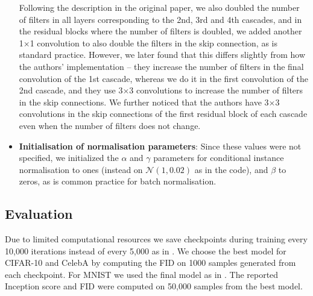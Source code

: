 \begin{itemize}
    Following the description in the original paper, we also doubled the number of filters in all layers corresponding to the 2nd, 3rd and 4th cascades, and in the residual blocks where the number of filters is doubled, we added another 1$\times$1 convolution to also double the filters in the skip connection, as is standard practice. However, we later found that this differs slightly from how the authors' implementation -- they increase the number of filters in the final convolution of the 1st cascade, whereas we do it in the first convolution of the 2nd cascade, and they use 3$\times$3 convolutions to increase the number of filters in the skip connections. We further noticed that the authors have 3$\times$3 convolutions in the skip connections of the first residual block of each cascade even when the number of filters does not change.
    \item %
    \textbf{Initialisation of normalisation parameters}: Since these values were not specified, we initialized the $\alpha$ and $\gamma$ parameters for conditional instance normalisation to ones (instead on $\mathcal{N}(1, 0.02)$ as in the code), and $\beta$ to zeros, as is common practice for batch normalisation.
\end{itemize}




\subsection{Evaluation}
\label{sec:eval}

Due to limited computational resources we save checkpoints during training every 10,000 iterations instead of every 5,000 as in \cite{ncsn-paper}. We choose the best model for CIFAR-10 and CelebA by computing the FID on 1000 samples generated from each checkpoint. For MNIST we used the final model as in \cite{ncsn-paper}. The reported Inception score and FID were computed on 50,000 samples from the best model.
